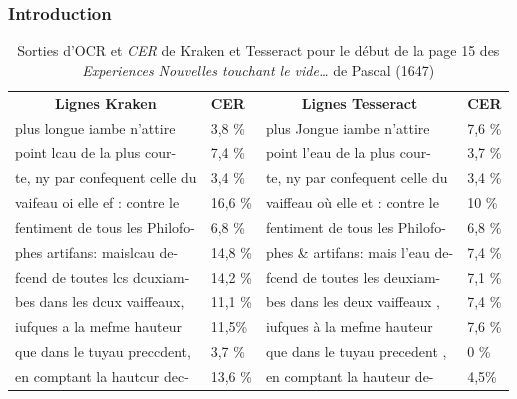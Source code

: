 \documentclass{beamer}
\begin{document}
	\begin{frame}\frametitle{Introduction}
		\begin{table}[h]
	    \begin{scriptsize}
	    \begin{tabular}{llll}
	    \multicolumn{1}{c}{\textbf{Lignes Kraken}} & \multicolumn{1}{l}{\textbf{CER}} & \multicolumn{1}{c}{\textbf{Lignes Tesseract}} & \multicolumn{1}{l}{\textbf{CER}} \\
	    plus longue iambe n'attire                 & 3,8 \%                         & plus Jongue iambe n'attire                    & 7,6 \%           \\
	    point lcau de la plus cour-                & 7,4 \%                         & point l'eau de la plus cour-                  & 3,7 \%           \\
	    te, ny par confequent celle du             & 3,4 \%                         & te, ny par confequent celle du                & 3,4 \%           \\
	    vaifeau oi elle ef : contre le             & 16,6 \%                        & vaiffeau où elle et : contre le               & 10 \%            \\
	    fentiment de tous les Philofo-             & 6,8 \%                         & fentiment de tous les Philofo-                & 6,8 \%           \\
	    phes artifans: maislcau de-                & 14,8 \%                        & phes \& artifans: mais l'eau de-              & 7,4 \%           \\
	    fcend de toutes lcs dcuxiam-               & 14,2 \%                        & fcend de toutes les deuxiam-                  & 7,1 \%           \\
	    bes dans les dcux vaiffeaux,               & 11,1 \%                        & bes dans les deux vaiffeaux ,                 & 7,4 \%           \\
	    iufques a la mefme hauteur                 & 11,5\%                         & iufques à la mefme hauteur                    & 7,6 \%            \\
	    que dans le tuyau preccdent,               & 3,7 \%                         & que dans le tuyau precedent ,                 & 0 \%             \\
	    en comptant la hautcur dec-                & 13,6 \%                        & en comptant la hauteur de-                    & 4,5\%           

	    \end{tabular}
	    \caption{Sorties d'OCR et \textit{CER} de Kraken et Tesseract pour le début de la page 15 des \textit{Experiences Nouvelles touchant le vide…} de Pascal (1647)} \label{ocr}
	    \end{scriptsize}
	    \end{table}
	\end{frame}
\end{document}
